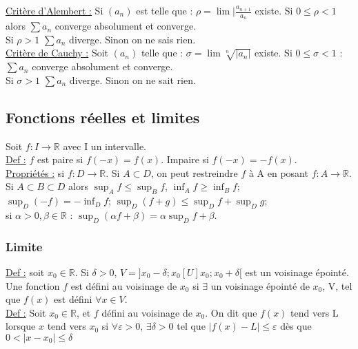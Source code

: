 \documentclass[../main.tex]{subfiles}
\begin{document}
 \quad \underline{Critère d'Alembert :} Si $(a_n)$ est telle que : $\rho = \lim |\frac{a_{n+1}}{a_n}$ existe. Si $0 \leq \rho < 1$ alors $\sum a_n$ converge absolument et converge.\\
 Si $\rho > 1$ $\sum a_n$ diverge. Sinon on ne sais rien.\\

 \quad \underline{Critère de Cauchy :} Soit $(a_n)$ telle que : $\sigma = \lim \sqrt[n]{|a_n|}$ existe. Si $0 \leq \sigma < 1$ : $\sum a_n$ converge absolument et converge.\\
 Si $\sigma>1$ $\sum a_n$ diverge. Sinon on ne sait rien.\\

 \subsection{Fonctions réelles et limites}
Soit $f:I\rightarrow \mathbb{R}$ avec I un intervalle. \\
\underline{Def :} $f$ est paire si $f(-x) = f(x)$. Impaire si $f(-x) = -f(x)$.\\

\underline{Propriétés :} si $f: D\rightarrow \mathbb{R}$. Si $A\subset D$, on peut restreindre $f$ à A en posant $f:A\rightarrow \mathbb{R}$. Si $A\subset B \subset D$ alors $\sup _A f \leq \sup_B f$, $\inf_A f \geq \inf_B f$;\\
$\sup_D(-f) = -\inf_Df$; $\sup_D (f+g) \leq \sup_D f+\sup_D g$;\\
si $\alpha > 0, \beta \in \mathbb{R}$ : $\sup_D(\alpha f+\beta) = \alpha\sup_D f + \beta$.\\


\subsubsection{Limite}
\underline{Def :} soit $x_0\in\mathbb{R}$. Si $\delta > 0$, $V = ]x_0 - \delta; x_0[U]x_0; x_0+\delta[$ est un voisinage épointé. Une fonction $f$ est défini au voisinage de $x_0$ si $\exists$ un voisinage épointé de $x_0$, V, tel que $f(x)$ est défini $\forall x\in V$.\\

\underline{Def :} Soit $x_0 \in \mathbb{R}$, et $f$ défini au voisinage de $x_0$. On dit que $f(x)$ tend vers L lorsque $x$ tend vers $x_0$ si $\forall \varepsilon > 0$, $\exists \delta > 0$ tel que $|f(x)-L| \leq \varepsilon$ dès que $0<|x-x_0| \leq \delta$\\
\end{document}
